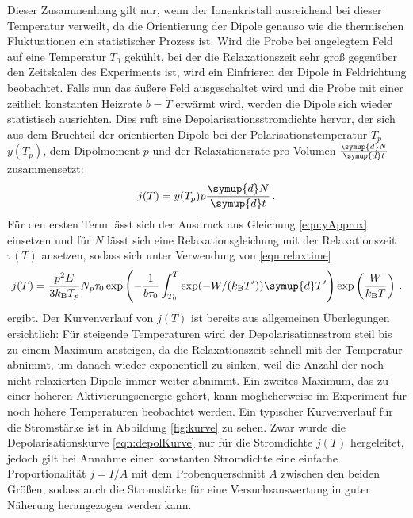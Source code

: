Dieser Zusammenhang gilt nur, wenn der Ionenkristall ausreichend bei dieser Temperatur verweilt, da die Orientierung der Dipole genauso wie die thermischen Fluktuationen ein statistischer Prozess ist. Wird die Probe bei angelegtem Feld auf eine Temperatur  $T_0$ gekühlt, bei der die Relaxationszeit sehr groß gegenüber den Zeitskalen des Experiments ist, wird ein Einfrieren der Dipole in Feldrichtung beobachtet. Falls nun das äußere Feld ausgeschaltet wird und die Probe mit einer zeitlich konstanten Heizrate $b=\dot{T}$ erwärmt wird, werden die Dipole sich wieder statistisch ausrichten. Dies ruft eine Depolarisationsstromdichte hervor, der sich aus dem Bruchteil der orientierten Dipole bei der Polarisationstemperatur $T_p$ $y(T_p)$, dem Dipolmoment $p$ und der Relaxationsrate pro Volumen $\frac{\symup{d}N}{\symup{d}t}$ zusammensetzt:
\begin{equation}
  j(T) = y(T_p) p \frac{\symup{d}N}{\symup{d}t}\,.
  \label{eqn:jAnsatz}
\end{equation}
Für den ersten Term lässt sich der Ausdruck aus Gleichung \eqref{eqn:yApprox} einsetzen und für $N$ lässt sich eine Relaxationsgleichung mit der Relaxationszeit $\tau(T)$ ansetzen, sodass sich unter Verwendung von \eqref{eqn:relaxtime}
\begin{equation}
  j(T) = \frac{p^2 E}{3 k_\text{B} T_p} {N_p}{\tau_0}
         \exp \left(- \frac{1}{b \tau_0} \int_{T_0}^{T} \exp(-W/(k_\text{B}T')) \symup{d}T' \right) \exp\left(\frac{W}{k_{\text{B}}T}\right)\,.
  \label{eqn:depolKurve}
\end{equation}
ergibt. Der Kurvenverlauf von $j(T)$ ist bereits aus allgemeinen Überlegungen ersichtlich: Für steigende Temperaturen wird der Depolarisationsstrom steil bis zu einem Maximum ansteigen, da die Relaxationszeit schnell mit der Temperatur abnimmt, um danach wieder exponentiell zu sinken, weil die Anzahl der noch nicht relaxierten Dipole immer weiter abnimmt. Ein zweites Maximum, das zu einer höheren Aktivierungsenergie gehört, kann möglicherweise im Experiment für noch höhere Temperaturen beobachtet werden. Ein typischer
Kurvenverlauf für die Stromstärke ist in Abbildung \ref{fig:kurve} zu sehen. Zwar wurde die Depolarisationskurve \eqref{eqn:depolKurve} nur für die Stromdichte $j(T)$ hergeleitet, jedoch gilt bei Annahme einer konstanten Stromdichte eine einfache Proportionalität $j=I/A$ mit dem Probenquerschnitt $A$ zwischen den beiden Größen, sodass auch die Stromstärke für eine Versuchsauswertung in guter Näherung herangezogen werden kann.

